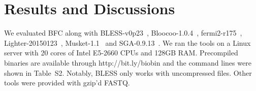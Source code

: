 \documentclass{bioinfo}
\begin{document}
\section{Results and Discussions}

We evaluated BFC along with
BLESS-v0p23~\citep{Heo:2014aa}, Bloocoo-1.0.4~\citep{Drezen:2014aa},
fermi2-r175~\citep{Li:2012fk}, Lighter-20150123~\citep{Song:2014aa},
Musket-1.1~\citep{Liu:2013ac} and SGA-0.9.13~\citep{Simpson:2012aa}.
We ran the tools on a Linux server with 20 cores of Intel
E5-2660 CPUs and 128GB RAM. Precompiled binaries are available through
http://bit.ly/biobin and the command lines were shown in Table~S2.
Notably, BLESS only works with uncompressed files. Other tools were
provided with gzip'd FASTQ.
\end{document}
